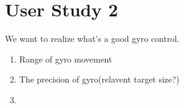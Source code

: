 \section{User Study 2}

We want to realize what's a good gyro control. 

\begin{enumerate}
\item Range of gyro movement
\item The precision of gyro(relavent target size?)
\item 
\end{enumerate}
